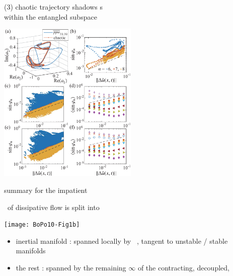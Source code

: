 \begin{frame}{(3) chaotic trajectory shadows \po s \\ within the entangled subspace}
\begin{center}
\includegraphics[width=0.5\textwidth]{../../dimension/ks22vecShadow}
\end{center}
\end{frame}

\begin{frame}{summary for the impatient}
\begin{block}{\statesp\ of dissipative flow is split into}
\begin{center}
\texttt{[image: BoPo10-Fig1b]}
\end{center}
\end{block}
\begin{itemize}
  \item inertial manifold :
spanned locally by
\textcolor{red}{\entangled\ \cLvs}, tangent to unstable / stable manifolds
  \item the rest : spanned by the remaining
$\infty$ of the contracting, decoupled,
\textcolor{blue}{\transient\ \cLvs}
\end{itemize}
\end{frame}

